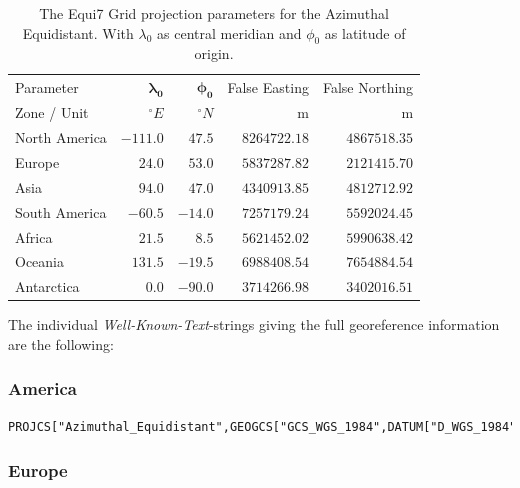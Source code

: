 \documentclass[11pt,a4paper]{article}
\begin{document}
\begin{table}[hbtp]
\centering
	{
	\begin{tabular}{lrrrr}
	\hline
	Parameter & $\mathbf{\lambda_{0}}$ & $\mathbf{\phi_{0}}$ & False Easting & False Northing \\
	Zone / Unit & $^{\circ}E$ & $^{\circ}N$ & m & m \\
	\hline
	North America & $-111.0$ & $47.5$ & $8264722.18$ & $4867518.35$ \\
	Europe & $24.0$ & $53.0$ & $5837287.82$ & $2121415.70$ \\
	Asia & $94.0$ & $47.0$ & $4340913.85$ & $4812712.92$ \\
	South America & $-60.5$ & $-14.0$ & $7257179.24$ & $5592024.45$ \\
	Africa & $21.5$ & $8.5$ & $5621452.02$ & $5990638.42$ \\
	Oceania & $131.5$ & $-19.5$ & $6988408.54$ & $7654884.54$ \\
	Antarctica & $0.0$ & $-90.0$ & $3714266.98$ & $3402016.51$ \\
	\hline
	\end{tabular} 
	}
\caption[Projection Parameter]{
The Equi7 Grid projection parameters for the Azimuthal Equidistant. With $\lambda_{0}$ as central meridian and $\phi_{0}$ as latitude of origin.
}
\label{tab:projections}
\end{table}

The individual \textit{Well-Known-Text}-strings giving the full georeference information are the following:

\subsubsection*{America}

\begin{lstlisting}
PROJCS["Azimuthal_Equidistant",GEOGCS["GCS_WGS_1984",DATUM["D_WGS_1984",SPHEROID["WGS_1984",6378137.0,298.257223563]],PRIMEM["Greenwich",0.0],UNIT["Degree",0.0174532925199433]],PROJECTION["Azimuthal_Equidistant"],PARAMETER["false_easting",8264722.17686],PARAMETER["false_northing",4867518.35323],PARAMETER["central_meridian",-97.5],PARAMETER["latitude_of_origin",52.0],UNIT["Meter",1.0]]
\end{lstlisting}

\subsubsection*{Europe}
\end{document}
